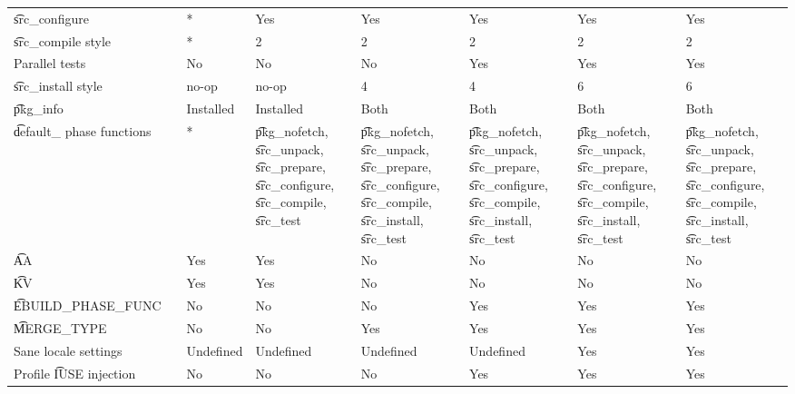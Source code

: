 \begin{landscape}
\begin{longtable}{llP{7.5em}P{7.5em}P{7.5em}P{7.5em}P{7.5em}P{7.5em}}
\t{src_configure} &  &
    * & Yes & Yes & Yes & Yes & Yes \\

\t{src_compile} style &  &
    * & 2 & 2 & 2 & 2 & 2 \\

Parallel tests &  &
    No & No & No & Yes & Yes & Yes \\

\t{src_install} style &  &
    no-op & no-op & 4 & 4 & 6 & 6 \\

\t{pkg_info} &  &
    Installed & Installed & Both & Both & Both & Both \\

\t{default_} phase functions &  &
    * &
    \t{pkg_nofetch}, \t{src_unpack}, \t{src_prepare}, \t{src_configure},
        \t{src_compile}, \t{src_test} &
    \t{pkg_nofetch}, \t{src_unpack}, \t{src_prepare}, \t{src_configure},
        \t{src_compile}, \t{src_install}, \t{src_test} &
    \t{pkg_nofetch}, \t{src_unpack}, \t{src_prepare}, \t{src_configure},
        \t{src_compile}, \t{src_install}, \t{src_test} &
    \t{pkg_nofetch}, \t{src_unpack}, \t{src_prepare}, \t{src_configure},
        \t{src_compile}, \t{src_install}, \t{src_test} &
    \t{pkg_nofetch}, \t{src_unpack}, \t{src_prepare}, \t{src_configure},
        \t{src_compile}, \t{src_install}, \t{src_test} \\

\t{AA} &  &
    Yes & Yes & No & No & No & No \\

\t{KV} &  &
    Yes & Yes & No & No & No & No \\

\t{EBUILD_PHASE_FUNC} &  &
    No & No & No & Yes & Yes & Yes \\

\t{MERGE_TYPE} &  &
    No & No & Yes & Yes & Yes & Yes \\

Sane locale settings &  &
    Undefined & Undefined & Undefined & Undefined & Yes & Yes \\

Profile \t{IUSE} injection &  &
    No & No & No & Yes & Yes & Yes \\


\end{longtable}
\end{landscape}
